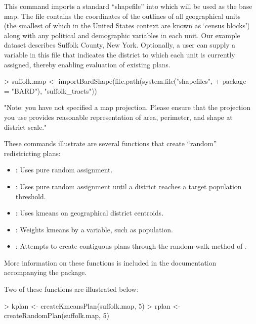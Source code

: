 \documentclass[article]{JSSstyle/jss}
\begin{document}
This command imports a standard ``shapefile'' into  which will be used as the base map.
The file contains the coordinates of the outlines of all geographical units (the smallest of which in the United States context are known as `census blocks') along with any political and demographic variables in each unit. Our example dataset describes Suffolk County, New York. Optionally, a user can supply a variable in this file that indicates the district to which each unit is currently assigned, thereby enabling evaluation of existing plans. 

\begin{Schunk}
\begin{Sinput}
> suffolk.map <- importBardShape(file.path(system.file("shapefiles", 
+     package = "BARD"), "suffolk_tracts"))
\end{Sinput}
\begin{Soutput}
[1] "Note: you have not specified a map projection. Please ensure that the projection you use provides reasonable representation of area, perimeter, and shape at district scale."
\end{Soutput}
\end{Schunk}

These commands illustrate are several  functions that create ``random'' redistricting plans:
\begin{itemize}
	\item {}: Uses pure random assignment.
	\item {}: Uses pure random assignment until a district reaches a target population threshold.
	\item {}: Uses kmeans on geographical district centroids.
	\item {}: Weights kmeans by a variable, such as population.
	\item {}: Attempts to create contiguous plans through the random-walk method of \citet{CirDarOro00}.
\end{itemize}
More information on these functions is included in the documentation accompanying the package.

Two of these functions are illustrated below:
\begin{Schunk}
\begin{Sinput}
> kplan <- createKmeansPlan(suffolk.map, 5)
> rplan <- createRandomPlan(suffolk.map, 5)
\end{Sinput}
\end{Schunk}
\end{document}
